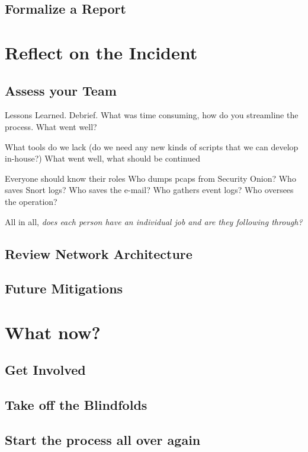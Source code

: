 \documentclass[11pt]{article}
\begin{document}
	\subsection{Formalize a Report}


	\section{Reflect on the Incident}
	\subsection{Assess your Team}

	Lessons Learned.
	Debrief. What was time consuming, how do you streamline the process.
	What went well?

	What tools do we lack (do we need any new kinds of scripts that we can develop in-house?)
	What went well, what should be continued

	Everyone should know their roles
		Who dumps pcaps from Security Onion?
		Who saves Snort logs?
		Who saves the e-mail?
		Who gathers event logs?
		Who oversees the operation?

	All in all, \textit{does each person have an individual job and are they following through?}

	\subsection{Review Network Architecture}
	\subsection{Future Mitigations}



	\section{What now?}

	\subsection{Get Involved}
	\subsection{Take off the Blindfolds}
	\subsection{Start the process all over again}
\end{document}
